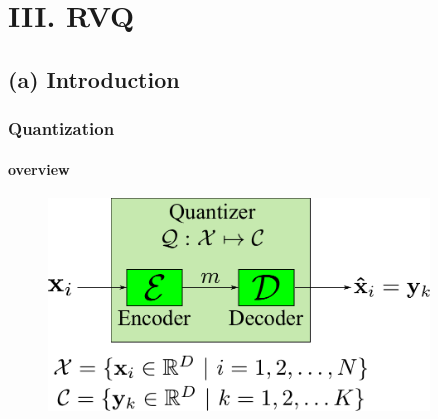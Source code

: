\section{III. RVQ}
\subsection{(a) Introduction}

\begin{frame}
\frametitle{Quantization}
\framesubtitle{overview}
\logoCSIPCPL\mypagenum
	\begin{figure}				
		\includegraphics[width=0.9\textwidth]{thesis/Quantization_blockDiagram.pdf}
	\end{figure}
\end{frame}





